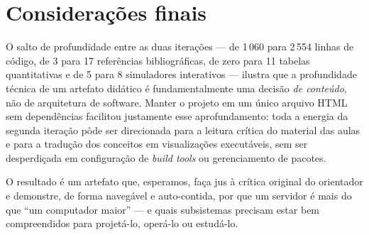 \section{Considerações finais}

O salto de profundidade entre as duas iterações --- de 1\,060 para
2\,554 linhas de código, de 3 para 17 referências bibliográficas,
de zero para 11 tabelas quantitativas e de 5 para 8 simuladores
interativos --- ilustra que a profundidade técnica de um artefato
didático é fundamentalmente uma decisão \emph{de conteúdo}, não de
arquitetura de software. Manter o projeto em um único arquivo HTML
sem dependências facilitou justamente esse aprofundamento: toda a
energia da segunda iteração pôde ser direcionada para a leitura
crítica do material das aulas e para a tradução dos conceitos em
visualizações executáveis, sem ser desperdiçada em configuração de
\emph{build tools} ou gerenciamento de pacotes.

O resultado é um artefato que, esperamos, faça jus à
crítica original do orientador e demonstre, de forma navegável e
auto-contida, por que um servidor é mais do que ``um computador
maior'' --- e quais subsistemas precisam estar bem compreendidos
para projetá-lo, operá-lo ou estudá-lo.
